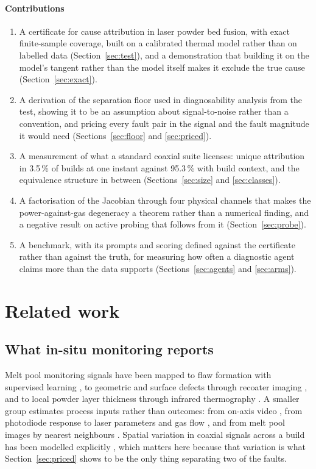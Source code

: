 \documentclass[preprint,12pt]{elsarticle}
\begin{document}
\paragraph{Contributions}
\begin{enumerate}
\item A certificate for cause attribution in laser powder bed fusion, with
exact finite-sample coverage, built on a calibrated thermal model rather than on
labelled data (Section~\ref{sec:test}), and a demonstration that building it on
the model's tangent rather than the model itself makes it exclude the true cause
(Section~\ref{sec:exact}).
\item A derivation of the separation floor used in diagnosability analysis from
the test, showing it to be an assumption about signal-to-noise rather than a
convention, and pricing every fault pair in the signal and the fault magnitude
it would need (Sections~\ref{sec:floor} and \ref{sec:priced}).
\item A measurement of what a standard coaxial suite licenses: unique
attribution in 3.5\,\% of builds at one instant against 95.3\,\% with build
context, and the equivalence structure in between
(Sections~\ref{sec:size} and \ref{sec:classes}).
\item A factorisation of the Jacobian through four physical channels that makes
the power-against-gas degeneracy a theorem rather than a numerical finding, and
a negative result on active probing that follows from it
(Section~\ref{sec:probe}).
\item A benchmark, with its prompts and scoring defined against the certificate
rather than against the truth, for measuring how often a diagnostic agent claims
more than the data supports (Sections~\ref{sec:agents} and \ref{sec:arms}).
\end{enumerate}

\section{Related work}
\label{sec:related}

\subsection{What in-situ monitoring reports}

Melt pool monitoring signals have been mapped to flaw formation with supervised
learning \cite{Scime2019}, to geometric and surface defects through recoater
imaging \cite{Bugatti2022}, and to local powder layer thickness through infrared
thermography \cite{Liu2022}. A smaller group estimates process inputs rather
than outcomes: from on-axis video \cite{Blanc2024}, from photodiode response to
laser parameters and gas flow \cite{Reijonen2024}, and from melt pool images by
nearest neighbours \cite{kNN2025}. Spatial variation in coaxial signals across a
build has been modelled explicitly \cite{Raj2023}, which matters here because
that variation is what Section~\ref{sec:priced} shows to be the only thing
separating two of the faults.
\end{document}
